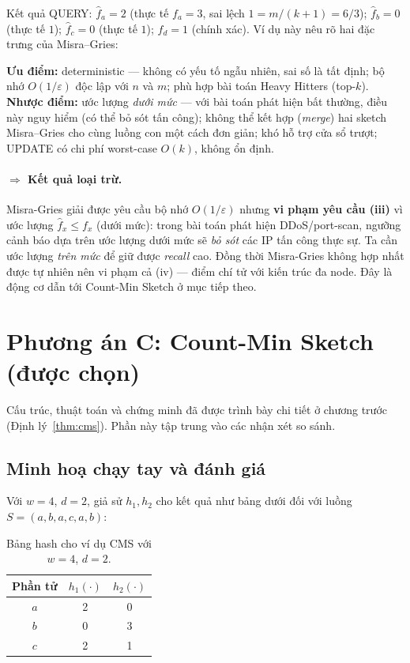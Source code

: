 Kết quả QUERY: $\hat{f}_a = 2$ (thực tế $f_a = 3$, sai lệch $1 = m/(k+1) = 6/3$); $\hat{f}_b = 0$ (thực tế $1$); $\hat{f}_c = 0$ (thực tế $1$); $\hat{f}_d = 1$ (chính xác). Ví dụ này nêu rõ hai đặc trưng của Misra--Gries:

\textbf{Ưu điểm:} deterministic --- không có yếu tố ngẫu nhiên, sai số là tất định; bộ nhớ $O(1/\varepsilon)$ độc lập với $n$ và $m$; phù hợp bài toán Heavy Hitters (top-$k$). \textbf{Nhược điểm:} ước lượng \textit{dưới mức} --- với bài toán phát hiện bất thường, điều này nguy hiểm (có thể bỏ sót tấn công); không thể kết hợp (\textit{merge}) hai sketch Misra--Gries cho cùng luồng con một cách đơn giản; khó hỗ trợ cửa sổ trượt; UPDATE có chi phí worst-case $O(k)$, không ổn định.

\paragraph{$\Rightarrow$ Kết quả loại trừ.}
Misra-Gries giải được yêu cầu bộ nhớ $O(1/\varepsilon)$ nhưng \textbf{vi phạm yêu cầu (iii)} vì ước lượng $\hat f_x \le f_x$ (dưới mức): trong bài toán phát hiện DDoS/port-scan, ngưỡng cảnh báo dựa trên ước lượng dưới mức sẽ \textit{bỏ sót} các IP tấn công thực sự. Ta cần ước lượng \textit{trên mức} để giữ được \textit{recall} cao. Đồng thời Misra-Gries không hợp nhất được tự nhiên nên vi phạm cả (iv) --- điểm chí tử với kiến trúc đa node. Đây là động cơ dẫn tới Count-Min Sketch ở mục tiếp theo.

\section{Phương án C: Count-Min Sketch (được chọn)}
\label{sec:cms}

Cấu trúc, thuật toán và chứng minh đã được trình bày chi tiết ở chương trước (Định lý~\ref{thm:cms}). Phần này tập trung vào các nhận xét so sánh.

\subsection{Minh hoạ chạy tay và đánh giá}

Với $w = 4$, $d = 2$, giả sử $h_1, h_2$ cho kết quả như bảng dưới đối với luồng $S = (a, b, a, c, a, b)$:

\begin{table}[H]
  \centering
  \caption{Bảng hash cho ví dụ CMS với $w = 4$, $d = 2$.}
  \label{tab:cms-hash}
  \begin{tabular}{@{}c c c@{}}
    \toprule
    \textbf{Phần tử} & $h_1(\cdot)$ & $h_2(\cdot)$ \\
    \midrule
    $a$ & 2 & 0 \\
    $b$ & 0 & 3 \\
    $c$ & 2 & 1 \\
    \bottomrule
  \end{tabular}
\end{table}

